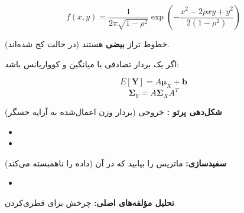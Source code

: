 \[f(x,y) = \frac{1}{2\pi\sqrt{1-\rho^2}} \exp\left(-\frac{x^2 - 2\rho xy + y^2}{2(1-\rho^2)}\right)\]

خطوط تراز \textbf{بیضی} هستند (در حالت  کج شده‌اند).



اگر  یک بردار تصادفی با میانگین  و کوواریانس  باشد:

\[E[\mathbf{Y}] = A\boldsymbol{\mu}_X + \mathbf{b}\]\PSbr{}\[\boldsymbol{\Sigma}_Y = A\boldsymbol{\Sigma}_X A^T\]


\textbf{شکل‌دهی پرتو :} خروجی  (بردار وزن اعمال‌شده به آرایه حسگر)

\begin{itemize}
\tightlist
\item
\item
\end{itemize}

\textbf{سفیدسازی:} ماتریس  را بیابید که در آن  (داده را ناهمبسته می‌کند)

\begin{itemize}
\tightlist
\item
\end{itemize}

\textbf{تحلیل مؤلفه‌های اصلی:} چرخش برای قطری‌کردن \lr{\ensuremath{\Sigma}}


